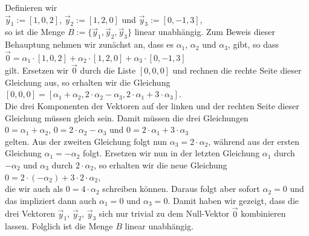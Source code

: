 \example
Definieren wir
\\[0.2cm]
\hspace*{1.3cm}
$\vec{y}_1 := [1, 0, 2]$, \quad  $\vec{y}_2 := [1, 2, 0]$ \quad und \quad $\vec{y}_3 := [0, -1, 3]$,
\\[0.2cm]
so ist die Menge $B := \{ \vec{y}_1, \vec{y}_2, \vec{y}_3 \}$
linear unabh\"{a}ngig.  Zum Beweis dieser Behauptung nehmen wir zun\"{a}chst an, dass es $\alpha_1$,
$\alpha_2$ und $\alpha_3$, gibt, so dass
\\[0.2cm]
\hspace*{1.3cm}
$\vec{0} = \alpha_1 \cdot [1,0,2] + \alpha_2 \cdot [1,2,0] + \alpha_3 \cdot [0,-1,3]$
\\[0.2cm]
gilt.  Ersetzen wir $\vec{0}$ durch die Liste $[0,0,0]$ und rechnen die rechte Seite
dieser Gleichung aus, so erhalten wir die Gleichung
\\[0.2cm]
\hspace*{1.3cm}
$[0,0,0] = [\alpha_1  + \alpha_2, 2 \cdot \alpha_2 - \alpha_3, 2 \cdot \alpha_1 + 3 \cdot \alpha_3]$.
\\[0.2cm]
Die drei Komponenten der Vektoren auf der linken und der rechten Seite dieser Gleichung m\"{u}ssen
gleich sein.  Damit m\"{u}ssen die drei Gleichungen
\\[0.2cm]
\hspace*{1.3cm}
$0 = \alpha_1 + \alpha_2$, \quad $0 = 2 \cdot \alpha_2 - \alpha_3$ \quad und \quad $0 = 2 \cdot \alpha_1 + 3 \cdot \alpha_3$
\\[0.2cm]
gelten.  Aus der zweiten Gleichung folgt nun $\alpha_3 = 2 \cdot \alpha_2$, w\"{a}hrend aus der ersten
Gleichung $\alpha_1 = - \alpha_2$ folgt.  Ersetzen wir nun in der letzten Gleichung 
$\alpha_1$ durch $-\alpha_2$ und $\alpha_3$ durch $2 \cdot \alpha_2$, so erhalten wir die neue Gleichung
\\[0.2cm]
\hspace*{1.3cm}
$0 = 2 \cdot (- \alpha_2) + 3 \cdot 2 \cdot \alpha_2$,
\\[0.2cm]
die wir auch als $0 = 4 \cdot \alpha_2$ schreiben k\"{o}nnen.  Daraus folgt aber sofort $\alpha_2 = 0$
und das impliziert dann auch $\alpha_1 = 0$ und $\alpha_3 = 0$.  Damit haben wir gezeigt, dass die drei
Vektoren $\vec{y}_1$, $\vec{y}_2$, $\vec{y}_3$ sich nur {\color{blue}trivial} zu dem Null-Vektor
$\vec{0}$ kombinieren lassen.  Folglich ist die Menge $B$ linear unabh\"{a}ngig.
\eoxs

